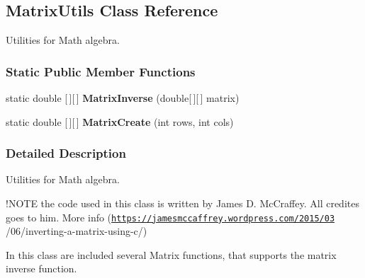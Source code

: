 \hypertarget{classDataTools_1_1MatrixUtils}{}\subsection{Matrix\+Utils Class Reference}
\label{classDataTools_1_1MatrixUtils}


Utilities for Math algebra.  


\subsubsection*{Static Public Member Functions}
\begin{DoxyCompactItemize}
\item 
\mbox{\label{classDataTools_1_1MatrixUtils_a8ef37b01bd38b764820a518f5227150c}} 
static double \mbox{[}$\,$\mbox{]}\mbox{[}$\,$\mbox{]} {\bfseries Matrix\+Inverse} (double\mbox{[}$\,$\mbox{]}\mbox{[}$\,$\mbox{]} matrix)
\item 
\mbox{\label{classDataTools_1_1MatrixUtils_a911aeda7bd108e241cbec94096196168}} 
static double \mbox{[}$\,$\mbox{]}\mbox{[}$\,$\mbox{]} {\bfseries Matrix\+Create} (int rows, int cols)
\end{DoxyCompactItemize}


\subsubsection{Detailed Description}
Utilities for Math algebra. 

!\+N\+O\+TE the code used in this class is written by James D. Mc\+Craffey. All credites goes to him. More info (\href{https://jamesmccaffrey.wordpress.com/2015/03}{\tt https\+://jamesmccaffrey.\+wordpress.\+com/2015/03} /06/inverting-\/a-\/matrix-\/using-\/c/)

In this class are included several Matrix functions, that supports the matrix inverse function. 